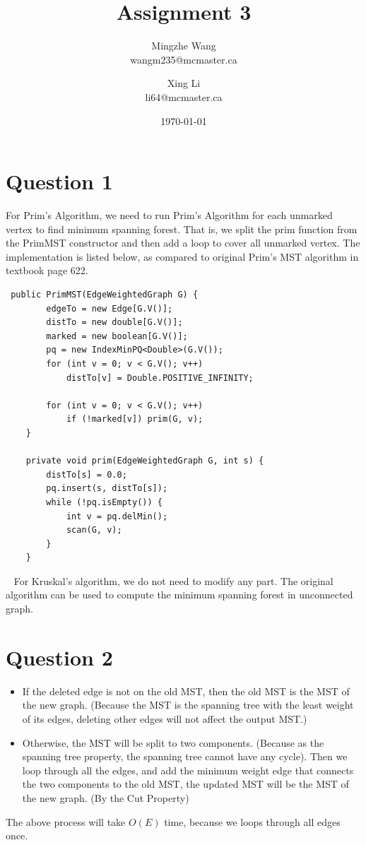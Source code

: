\documentclass[11pt]{article}
\author{Mingzhe Wang\\wangm235@mcmaster.ca
\and Xing Li\\li64@mcmaster.ca}
\date{\today}
\title{Assignment 3}
\begin{document}
\maketitle
\tableofcontents

\newpage

\section{Question 1}
For Prim's Algorithm, we need to run Prim's Algorithm for each unmarked vertex to find minimum spanning forest. That is, we split the prim function from the PrimMST constructor and then add a loop to cover all unmarked vertex. The implementation is listed below, as compared to original Prim's MST algorithm in textbook page 622.\\
\begin{lstlisting}
 public PrimMST(EdgeWeightedGraph G) {
        edgeTo = new Edge[G.V()];
        distTo = new double[G.V()];
        marked = new boolean[G.V()];
        pq = new IndexMinPQ<Double>(G.V());
        for (int v = 0; v < G.V(); v++)
            distTo[v] = Double.POSITIVE_INFINITY;

        for (int v = 0; v < G.V(); v++) 
            if (!marked[v]) prim(G, v); 
    }

    private void prim(EdgeWeightedGraph G, int s) {
        distTo[s] = 0.0;
        pq.insert(s, distTo[s]);
        while (!pq.isEmpty()) {
            int v = pq.delMin();
            scan(G, v);
        }
    }
\end{lstlisting}

~\newline\noindent
For Kruskal’s algorithm, we do not need to modify any part. The original algorithm can be used to compute the minimum spanning forest in unconnected graph.

\section{Question 2}
\begin{itemize}
\item If the deleted edge is not on the old MST, then the old MST is the MST of the new graph. (Because the MST is the spanning tree with the least weight of its edges, deleting other edges will not affect the output MST.)
\item Otherwise, the MST will be split to two components. (Because as the spanning tree property, the spanning tree cannot have any cycle). Then we loop through all the edges, and add the minimum weight edge that connects the two components to the old MST, the updated MST will be the MST of the new graph. (By the Cut Property)
\end{itemize}
The above process will take $O(E)$ time, because we loops through all edges once.
\end{document}
